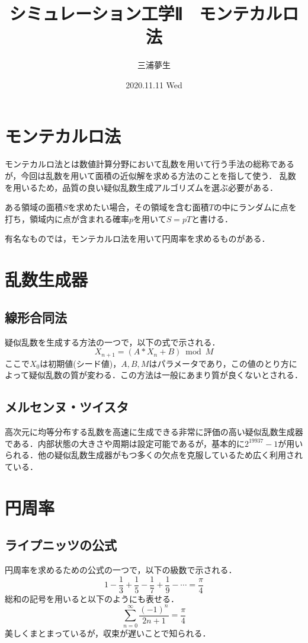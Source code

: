 \documentclass[a4paper, titlepage]{jsarticle}
\title{シミュレーション工学Ⅱ　モンテカルロ法}
\author{三浦夢生}
\date{2020.11.11 Wed}
\begin{document}
	\maketitle

	\section{モンテカルロ法}
	モンテカルロ法とは数値計算分野において乱数を用いて行う手法の総称であるが，今回は乱数を用いて面積の近似解を求める方法のことを指して使う．
	乱数を用いるため，品質の良い疑似乱数生成アルゴリズムを選ぶ必要がある．

	ある領域の面積$S$を求めたい場合，その領域を含む面積$T$の中にランダムに点を打ち，領域内に点が含まれる確率$p$を用いて$S=pT$と書ける．

	有名なものでは，モンテカルロ法を用いて円周率を求めるものがある．

	\section{乱数生成器}
	\subsection{線形合同法}
	疑似乱数を生成する方法の一つで，以下の式で示される．
		\begin{equation}
			X_{n+1}=(A*{X_n}+B)\bmod{M}
		\end{equation}
	ここで$X_0$は初期値(シード値)，$A,B,M$はパラメータであり，この値のとり方によって疑似乱数の質が変わる．この方法は一般にあまり質が良くないとされる．

	\subsection{メルセンヌ・ツイスタ}
	高次元に均等分布する乱数を高速に生成できる非常に評価の高い疑似乱数生成器である．内部状態の大きさや周期は設定可能であるが，基本的に$2^{19937}-1$が用いられる．他の疑似乱数生成器がもつ多くの欠点を克服しているため広く利用されている．

	\section{円周率}
	\subsection{ライプニッツの公式}
	円周率を求めるための公式の一つで，以下の級数で示される．
		\begin{equation}
			1-\frac{1}{3}+\frac{1}{5}-\frac{1}{7}+\frac{1}{9}-\cdots=\frac{\pi}{4}
		\end{equation}
	総和の記号を用いると以下のようにも表せる．
		\begin{equation}
			\sum_{n=0}^{\infty}\frac{(-1)^n}{2n+1}=\frac{\pi}{4}
		\end{equation}
	美しくまとまっているが，収束が遅いことで知られる．
\end{document}
